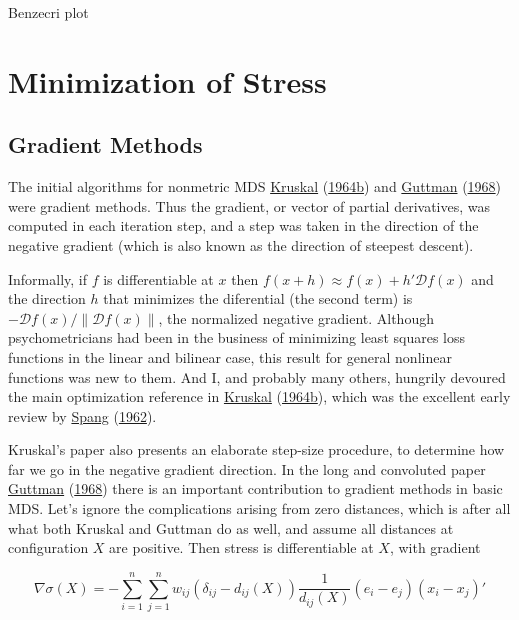 \documentclass[
  12pt,
]{book}
\theoremstyle{definition}
\theoremstyle{definition}
\theoremstyle{definition}
\theoremstyle{definition}
\theoremstyle{remark}
\begin{document}
Benzecri plot

\hypertarget{minstr}{%
\chapter{Minimization of Stress}\label{minstr}}

\hypertarget{gradient-methods}{%
\section{Gradient Methods}\label{gradient-methods}}

The initial algorithms for nonmetric MDS
\protect\hyperlink{ref-kruskal_64b}{Kruskal} (\protect\hyperlink{ref-kruskal_64b}{1964b}) and \protect\hyperlink{ref-guttman_68}{Guttman} (\protect\hyperlink{ref-guttman_68}{1968}) were gradient methods. Thus the gradient,
or vector of partial derivatives, was computed in each iteration step,
and a step was taken in the direction of the negative gradient (which is
also known as the direction of steepest descent).

Informally, if \(f\) is differentiable at \(x\) then
\(f(x+h)\approx f(x)+h'\mathcal{D}f(x)\) and the
direction \(h\) that minimizes the diferential (the second term) is
\(-\mathcal{D}f(x)/\|\mathcal{D}f(x)\|\), the normalized negative
gradient. Although psychometricians had been in the business of
minimizing least squares loss functions in the linear and bilinear case,
this result for general nonlinear functions was new to them. And I, and
probably many others, hungrily devoured the main optimization reference
in \protect\hyperlink{ref-kruskal_64b}{Kruskal} (\protect\hyperlink{ref-kruskal_64b}{1964b}), which was the excellent early review by \protect\hyperlink{ref-spang_62}{Spang} (\protect\hyperlink{ref-spang_62}{1962}).

Kruskal's paper also presents an elaborate step-size procedure, to
determine how far we go in the negative gradient direction. In the
long and convoluted paper \protect\hyperlink{ref-guttman_68}{Guttman} (\protect\hyperlink{ref-guttman_68}{1968}) there is an important contribution to
gradient methods in basic MDS. Let's ignore the complications
arising from zero distances, which is after all what both Kruskal and Guttman do as well, and assume all distances at configuration \(X\) are positive.
Then stress is differentiable at \(X\), with gradient

\[
\nabla\sigma(X)=
-\sum_{i=1}^n\sum_{j=1}^nw_{ij}(\delta_{ij}-d_{ij}(X))\frac{1}{d_{ij}(X)}
(e_i-e_j)(x_i-x_j)'
\]
\end{document}
